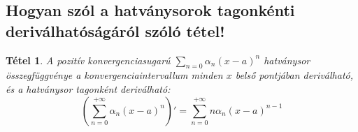 \documentclass[12pt,a4paper]{article}
\newcommand{\bb}[1]{\left( #1 \right)}
\newtheorem{tet}{Tétel}[section]
\begin{document}
\subsection{Hogyan szól a hatványsorok tagonkénti deriválhatóságáról szóló tétel!}
\begin{tet}
A pozitív konvergenciasugarú $\sum\limits_{n=0}\alpha_n(x-a)^n $ hatványsor összegfüggvénye a konvergenciaintervallum minden $x$ belső pontjában deriválható, és a hatványsor tagonként deriválható:
\[
\bb{\sum\limits_{n=0}^{+\infty}\alpha_n(x-a)^n}' = \sum\limits_{n=0}^{+\infty}n\alpha_n(x-a)^{n-1}
\]
\end{tet}
\end{document}
